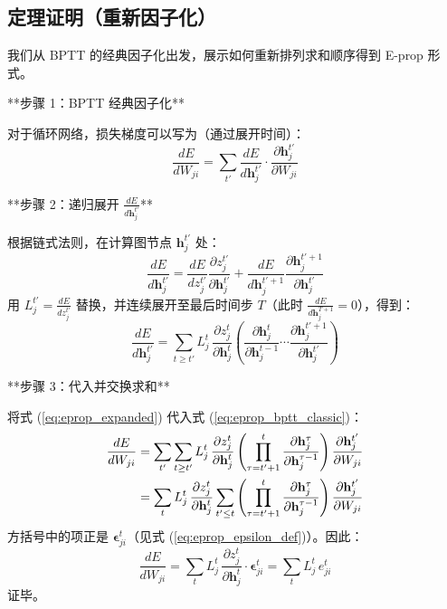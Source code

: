 \documentclass{article}
\begin{document}
\subsection{定理证明（重新因子化）}

我们从 BPTT 的经典因子化出发，展示如何重新排列求和顺序得到 E-prop 形式。

**步骤 1：BPTT 经典因子化**

对于循环网络，损失梯度可以写为（通过展开时间）：
\begin{equation}
\frac{dE}{dW_{ji}} = \sum_{t'} \frac{dE}{d\mathbf{h}_j^{t'}} \cdot \frac{\partial \mathbf{h}_j^{t'}}{\partial W_{ji}}
\label{eq:eprop_bptt_classic}
\end{equation}

**步骤 2：递归展开 $\frac{dE}{d\mathbf{h}_j^{t'}}$**

根据链式法则，在计算图节点 $\mathbf{h}_j^{t'}$ 处：
\begin{equation}
\frac{dE}{d\mathbf{h}_j^{t'}} = 
\frac{dE}{d z_j^{t'}} \frac{\partial z_j^{t'}}{\partial \mathbf{h}_j^{t'}}
+
\frac{dE}{d\mathbf{h}_j^{t'+1}} \frac{\partial \mathbf{h}_j^{t'+1}}{\partial \mathbf{h}_j^{t'}}
\label{eq:eprop_recursive_expand}
\end{equation}
用 $L_j^{t'} = \frac{dE}{d z_j^{t'}}$ 替换，并连续展开至最后时间步 $T$（此时 $\frac{dE}{d\mathbf{h}_j^{T+1}}=0$），得到：
\begin{equation}
\frac{dE}{d\mathbf{h}_j^{t'}} = 
\sum_{t \ge t'} L_j^t \,
\frac{\partial z_j^t}{\partial \mathbf{h}_j^t}
\left( \frac{\partial \mathbf{h}_j^t}{\partial \mathbf{h}_j^{t-1}} \cdots \frac{\partial \mathbf{h}_j^{t'+1}}{\partial \mathbf{h}_j^{t'}} \right)
\label{eq:eprop_expanded}
\end{equation}

**步骤 3：代入并交换求和**

将式 (\ref{eq:eprop_expanded}) 代入式 (\ref{eq:eprop_bptt_classic})：
\begin{align}
\frac{dE}{dW_{ji}} &= 
\sum_{t'} \sum_{t \ge t'} L_j^t \,
\frac{\partial z_j^t}{\partial \mathbf{h}_j^t}
\left( \prod_{\tau=t'+1}^{t} \frac{\partial \mathbf{h}_j^{\tau}}{\partial \mathbf{h}_j^{\tau-1}} \right)
\frac{\partial \mathbf{h}_j^{t'}}{\partial W_{ji}} \notag \\
&= 
\sum_{t} L_j^t \,
\frac{\partial z_j^t}{\partial \mathbf{h}_j^t}
\sum_{t' \le t}
\left( \prod_{\tau=t'+1}^{t} \frac{\partial \mathbf{h}_j^{\tau}}{\partial \mathbf{h}_j^{\tau-1}} \right)
\frac{\partial \mathbf{h}_j^{t'}}{\partial W_{ji}}
\label{eq:eprop_swap}
\end{align}
方括号中的项正是 $\boldsymbol{\epsilon}_{ji}^t$（见式 (\ref{eq:eprop_epsilon_def})）。因此：
\begin{equation}
\frac{dE}{dW_{ji}} = \sum_t L_j^t \, \frac{\partial z_j^t}{\partial \mathbf{h}_j^t} \cdot \boldsymbol{\epsilon}_{ji}^t = \sum_t L_j^t \, e_{ji}^t
\label{eq:eprop_final}
\end{equation}
证毕。
\end{document}
